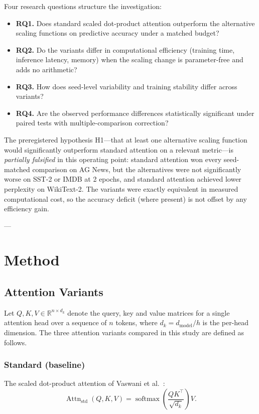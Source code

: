 \documentclass[10pt,a4paper]{article}
\begin{document}
Four research questions structure the investigation:
\begin{itemize}[leftmargin=1.6em, itemsep=2pt]
  \item \textbf{RQ1.} Does standard scaled dot-product attention outperform the alternative scaling functions on predictive accuracy under a matched budget?
  \item \textbf{RQ2.} Do the variants differ in computational efficiency (training time, inference latency, memory) when the scaling change is parameter-free and adds no arithmetic?
  \item \textbf{RQ3.} How does seed-level variability and training stability differ across variants?
  \item \textbf{RQ4.} Are the observed performance differences statistically significant under paired tests with multiple-comparison correction?
\end{itemize}

The preregistered hypothesis H1---that at least one alternative scaling function would significantly outperform standard attention on a relevant metric---is \emph{partially falsified} in this operating point: standard attention won every seed-matched comparison on AG News, but the alternatives were not significantly worse on SST-2 or IMDB at 2 epochs, and standard attention achieved lower perplexity on WikiText-2. The variants were exactly equivalent in measured computational cost, so the accuracy deficit (where present) is not offset by any efficiency gain.

---

\section{Method}

\subsection{Attention Variants}

Let $Q, K, V \in \mathbb{R}^{n \times d_k}$ denote the query, key and value matrices for a single attention head over a sequence of $n$ tokens, where $d_k = d_{\text{model}} / h$ is the per-head dimension. The three attention variants compared in this study are defined as follows.

\subsubsection{Standard (baseline)}
The scaled dot-product attention of Vaswani et al.~\cite{vaswani2017}:
\begin{equation}\label{eq:standard}
  \operatorname{Attn}_{\mathrm{std}}(Q,K,V)
    = \operatorname{softmax}\!\left(\frac{QK^{\top}}{\sqrt{d_k}}\right)V .
\end{equation}
\end{document}
